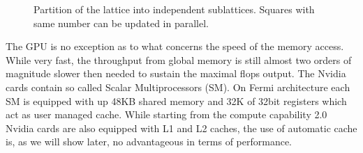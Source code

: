 \documentclass[a4paper]{llncs}
\def\bksize{8}
\begin{document}
\begin{figure}
\begin{center} 
\end{center}
\caption{\label{fig:part}Partition of the lattice into independent
  sublattices. Squares with same number can be updated in parallel.}
\end{figure}



The GPU is no exception as to what concerns the speed of the memory
access.  While very fast, the throughput from global memory is still
almost two orders of magnitude slower then needed to sustain the
maximal flops output.  The Nvidia cards contain so called { Scalar
  Multiprocessors} (SM). On Fermi architecture each SM is equipped
with up 48KB shared memory and 32K of 32bit registers\cite{Fermi}
which act as user managed cache. While starting from the compute
capability 2.0 Nvidia cards are also equipped with L1 and L2 caches,
the use of automatic cache is, as we will show later, no advantageous
in terms of performance.
\end{document}
